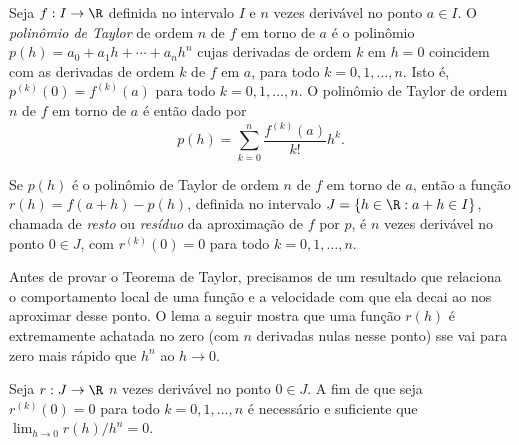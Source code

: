 \documentclass{article}
\begin{document}
\begin{defn}
    Seja \(f: I \to \R\) definida no intervalo \(I\) e \(n\) vezes derivável no ponto \(a \in I\). O \emph{polinômio de Taylor} de ordem \(n\) de \(f\) em torno de \(a\) é o polinômio \(p(h) = a_0 + a_1 h + \cdots + a_n h^n\) cujas derivadas de ordem \(k\) em \(h=0\) coincidem com as derivadas de ordem \(k\) de \(f\) em \(a\), para todo \(k = 0, 1, \ldots, n\). Isto é, \(p^{(k)}(0) = f^{(k)}(a)\) para todo \(k = 0, 1, \ldots, n\). O polinômio de Taylor de ordem \(n\) de \(f\) em torno de \(a\) é então dado por
\begin{equation}
    p(h) = \sum_{k=0}^{n} \frac{f^{(k)}(a)}{k!} h^k.
\end{equation}

    Se \(p(h)\) é o polinômio de Taylor de ordem \(n\) de \(f\) em torno de \(a\), então a função \(r(h) = f(a+h) - p(h)\), definida no intervalo \(J = \{h \in \R : a+h \in I\}\), chamada de \emph{resto} ou \emph{resíduo} da aproximação de \(f\) por \(p\), é \(n\) vezes derivável no ponto \(0 \in J\), com \(r^{(k)}(0) = 0\) para todo \(k = 0, 1, \ldots, n\).
\end{defn}

Antes de provar o Teorema de Taylor, precisamos de um resultado que relaciona o comportamento local de uma função e a velocidade com que ela decai ao nos aproximar desse ponto. O lema a seguir mostra que uma função \(r(h)\) é extremamente achatada no zero (com \(n\) derivadas nulas nesse ponto) sse vai para zero mais rápido que \(h^n\) ao \(h \to 0\).

\begin{lem}
    Seja \(r: J \to \R\) \(n\) vezes derivável no ponto \(0 \in J\). A fim de que seja \(r^{(k)}(0) = 0\) para todo \(k = 0, 1, \ldots, n\) é necessário e suficiente que \(\lim_{h \to 0} r(h)/h^n = 0\).
\end{lem}
\end{document}
